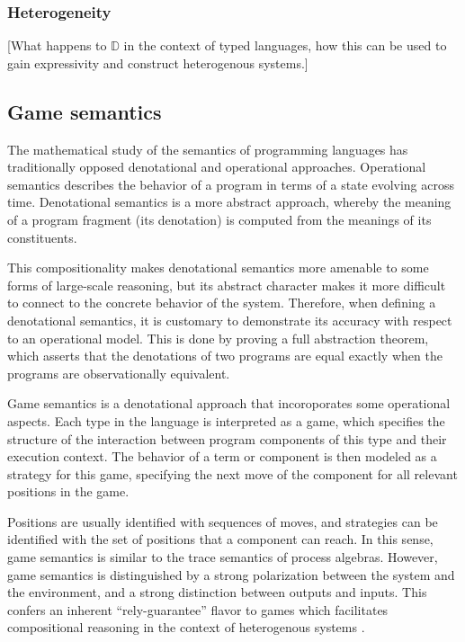 \documentclass[acmsmall,timestamp,review]{acmart}
\begin{document}

\subsubsection{Heterogeneity} %

[What happens to $\mathbb{D}$ in the context of typed languages,
how this can be used to gain expressivity and construct heterogenous systems.]



\subsection{Game semantics} %


The mathematical study of the semantics of programming languages
has traditionally opposed denotational and operational approaches.
Operational semantics describes
the behavior of a program in terms of
a state evolving across time.
Denotational semantics is a more abstract approach,
whereby the meaning of a program fragment (its denotation)
is computed from the meanings of its constituents.

This compositionality makes denotational semantics
more amenable to some forms of large-scale reasoning,
but its abstract character makes it more difficult
to connect to the concrete behavior of the system.
Therefore, when defining a denotational semantics,
it is customary to demonstrate its accuracy
with respect to an operational model.
This is done by proving a full abstraction theorem,
which asserts that the denotations of two programs
are equal exactly when the programs are observationally equivalent.

Game semantics is a denotational approach that
incoroporates some operational aspects.
Each type in the language
is interpreted as a game,
which specifies the structure of the interaction
between program components of this type
and their execution context.
The behavior of a term or component
is then modeled as a strategy for this game,
specifying the next move of the component
for all relevant positions in the game.

Positions are usually identified with sequences of moves,
and strategies can be identified with the set of positions
that a component can reach.
In this sense,
game semantics is similar to
the trace semantics of process algebras.
However, game semantics is distinguished
by a strong polarization between
the system and the environment,
and a strong distinction between outputs and inputs.
This confers an inherent ``rely-guarantee'' flavor
to games which facilitates compositional reasoning
in the context of heterogenous systems \cite{cspgs}.
\end{document}
